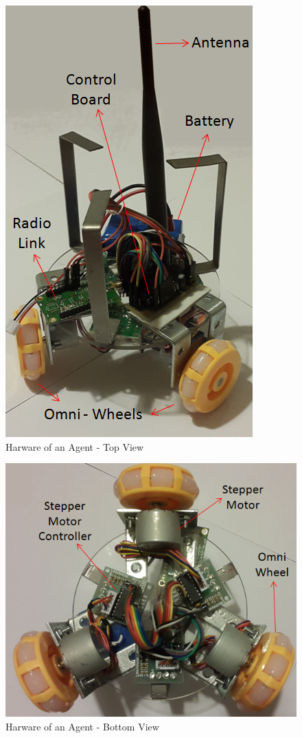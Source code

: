 \begin{figure}[H]
\caption{Harware of an Agent - Top View} \label{topview_ref}
\centerline{\includegraphics[scale = 0.80]{hardware1}}
\end{figure} 

\begin{figure}[H]
\caption{Harware of an Agent - Bottom View} \label{bottomview_ref}
\centerline{\includegraphics[scale = 0.80]{hardware2}}
\end{figure} 
		
